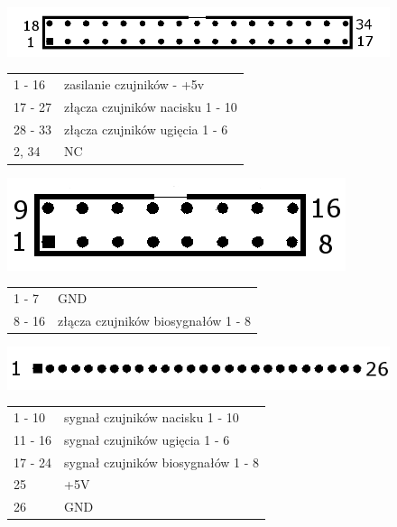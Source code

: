 ﻿\documentclass{article}
\begin{document}
\begin{figure}[h!]
	\centering
	\includegraphics[width=\textwidth/3]{J1.png}
	\caption{J1 - pinout}
	\label{rys:J1 - pinout}

	\begin{table}
	\centering
	\label{J1 - pinout}
	\begin{tabular}{ll}
	1 - 16		&	zasilanie czujników - +5v		\\
	17 - 27		&	złącza czujników nacisku 1 - 10		\\
	28 - 33		&	złącza czujników ugięcia 1 - 6		\\
	2, 34		&	NC					\\
\end{tabular}
\end{table}
\end{figure}

\begin{figure}[h!]
	\centering
	\includegraphics[width=\textwidth/6]{J2.png}
	\caption{J2 - pinout}
	\label{rys:J2 - pinout}

	\begin{table}
	\centering
	\label{J2 - pinout}
	\begin{tabular}{ll}
	1 - 7		&	GND					\\
	8 - 16		&	złącza czujników biosygnałów 1 - 8	\\
\end{tabular}
\end{table}
\end{figure}

\begin{figure}[h!]
	\centering
	\includegraphics[width=\textwidth/2]{J3.png}
	\caption{J3 - pinout}
	\label{rys:J3 - pinout}

	\begin{table}
	\centering
	\label{J3 - pinout}
	\begin{tabular}{ll}
	1 - 10		&	sygnał czujników nacisku 1 - 10		\\
	11 - 16		&	sygnał czujników ugięcia 1 - 6		\\
	17 - 24		&	sygnał czujników biosygnałów 1 - 8	\\
	25		&	+5V					\\
	26		&	GND					\\
\end{tabular}
\end{table}
\end{figure}
\end{document}
